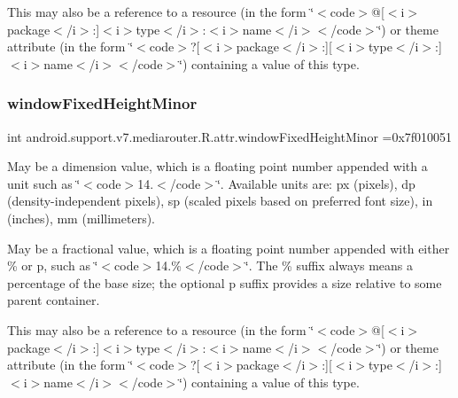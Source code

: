 This may also be a reference to a resource (in the form \char`\"{}$<$code$>$@\mbox{[}$<$i$>$package$<$/i$>$\+:\mbox{]}$<$i$>$type$<$/i$>$\+:$<$i$>$name$<$/i$>$$<$/code$>$\char`\"{}) or theme attribute (in the form \char`\"{}$<$code$>$?\mbox{[}$<$i$>$package$<$/i$>$\+:\mbox{]}\mbox{[}$<$i$>$type$<$/i$>$\+:\mbox{]}$<$i$>$name$<$/i$>$$<$/code$>$\char`\"{}) containing a value of this type. \mbox{\label{classandroid_1_1support_1_1v7_1_1mediarouter_1_1R_1_1attr_a6225254ac3740a7bf55305b4825f479b}} 
\subsubsection{\texorpdfstring{window\+Fixed\+Height\+Minor}{windowFixedHeightMinor}}
{\footnotesize\ttfamily int android.\+support.\+v7.\+mediarouter.\+R.\+attr.\+window\+Fixed\+Height\+Minor =0x7f010051\hspace{0.3cm}{\ttfamily [static]}}

May be a dimension value, which is a floating point number appended with a unit such as \char`\"{}$<$code$>$14.\+5sp$<$/code$>$\char`\"{}. Available units are\+: px (pixels), dp (density-\/independent pixels), sp (scaled pixels based on preferred font size), in (inches), mm (millimeters). 

May be a fractional value, which is a floating point number appended with either \% or p, such as \char`\"{}$<$code$>$14.\%$<$/code$>$\char`\"{}. The \% suffix always means a percentage of the base size; the optional p suffix provides a size relative to some parent container. 

This may also be a reference to a resource (in the form \char`\"{}$<$code$>$@\mbox{[}$<$i$>$package$<$/i$>$\+:\mbox{]}$<$i$>$type$<$/i$>$\+:$<$i$>$name$<$/i$>$$<$/code$>$\char`\"{}) or theme attribute (in the form \char`\"{}$<$code$>$?\mbox{[}$<$i$>$package$<$/i$>$\+:\mbox{]}\mbox{[}$<$i$>$type$<$/i$>$\+:\mbox{]}$<$i$>$name$<$/i$>$$<$/code$>$\char`\"{}) containing a value of this type. \mbox{\label{classandroid_1_1support_1_1v7_1_1mediarouter_1_1R_1_1attr_ae56e50cdd34b9aa2991748fffbe15989}} 
